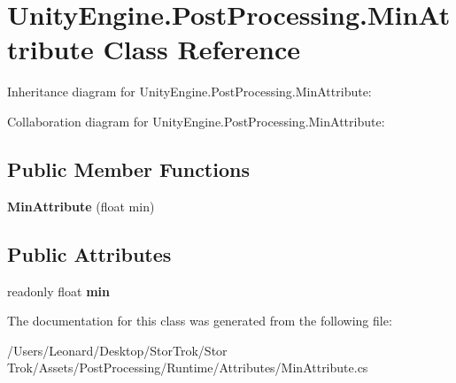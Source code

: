 \hypertarget{class_unity_engine_1_1_post_processing_1_1_min_attribute}{}\section{Unity\+Engine.\+Post\+Processing.\+Min\+Attribute Class Reference}
\label{class_unity_engine_1_1_post_processing_1_1_min_attribute}


Inheritance diagram for Unity\+Engine.\+Post\+Processing.\+Min\+Attribute\+:


Collaboration diagram for Unity\+Engine.\+Post\+Processing.\+Min\+Attribute\+:
\subsection*{Public Member Functions}
\begin{DoxyCompactItemize}
\item 
\mbox{\label{class_unity_engine_1_1_post_processing_1_1_min_attribute_ad7f32ba10ec48ba5d4b9eb31e43d1f5a}} 
{\bfseries Min\+Attribute} (float min)
\end{DoxyCompactItemize}
\subsection*{Public Attributes}
\begin{DoxyCompactItemize}
\item 
\mbox{\label{class_unity_engine_1_1_post_processing_1_1_min_attribute_abb5d80c69026f677751e55a30bfc2e84}} 
readonly float {\bfseries min}
\end{DoxyCompactItemize}


The documentation for this class was generated from the following file\+:\begin{DoxyCompactItemize}
\item 
/\+Users/\+Leonard/\+Desktop/\+Stor\+Trok/\+Stor Trok/\+Assets/\+Post\+Processing/\+Runtime/\+Attributes/Min\+Attribute.\+cs\end{DoxyCompactItemize}
